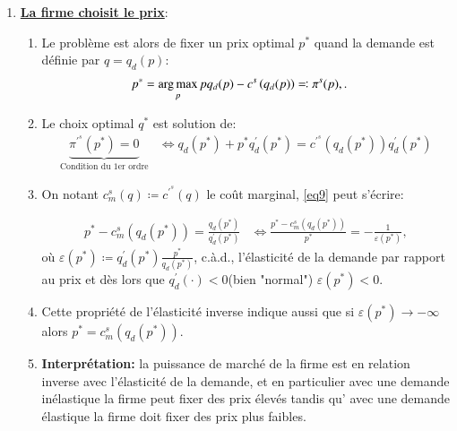 \begin{frame}
\begin{itemize}
\begin{enumerate}
  \item \textbf{\underline{La firme choisit le prix}}:
  \begin{enumerate}[$\cdot$]
  \item Le problème est alors de fixer un prix optimal $p^*$ quand la demande est définie par $q = q_d(p)$:
  \begin{align}
  p^* &= \argmax_{p} pq_d(p)- c^s\left(q_d(p)\right) \eqqcolon \pi^s(p), \label{eq9}.
  \end{align}
   \item  Le choix optimal $q^*$ est solution de:
  \begin{align}
   \underbrace{\pi^{\prime^s}(p^*) = 0}_{\text{Condition du 1er ordre}}&\Leftrightarrow  q_d(p^*) + p^*q_d^\prime(p^*) = c^{\prime^s}\left(q_d(p^*)\right)q_d^\prime(p^*)
   \label{eq9}
  \end{align}
  \item On notant $c^s_m(q)\coloneqq  c^{\prime^s}(q)$ le coût marginal, \eqref{eq9} peut s'écrire:
  
  \begin{align}
  p^* - c^s_m\left(q_d(p^*)\right) = \frac{q_d(p^*)}{q_d^\prime(p^*)} &\Leftrightarrow \frac{p^* - c^s_m\left(q_d(p^*)\right)}{p^*} = -\frac{1}{\varepsilon(p^*)},
  \label{eq10}
  \end{align}
  où $\varepsilon(p^*) \coloneqq q_d^\prime(p^*) \frac{p^*}{q_d(p^*)}$, c.à.d., l'élasticité de la demande par rapport au prix et dès lors que $q_d^\prime(\cdot)<0$(bien "normal")  $\varepsilon(p^*)<0$.
  \item Cette propriété de l'élasticité inverse indique aussi que si $\varepsilon(p^*) \to -\infty$ alors $p^* =  c^s_m\left(q_d(p^*)\right)$.
  \item \textbf{Interprétation:} la puissance de marché de la firme est en relation inverse avec l'élasticité de la demande, et en particulier  avec une demande inélastique la firme peut fixer des prix élevés tandis qu' avec une demande élastique la firme doit fixer des prix plus faibles.
  \end{enumerate}
  \end{enumerate}
  \end{itemize}
  \end{frame}

